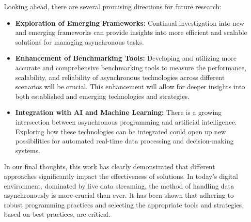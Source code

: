 Looking ahead, there are several promising directions for future research:

\begin{itemize}
    \item \textbf{Exploration of Emerging Frameworks:} Continual investigation into new and emerging frameworks can provide insights into more efficient and scalable solutions for managing asynchronous tasks.
    \item \textbf{Enhancement of Benchmarking Tools:} Developing and utilizing more accurate and comprehensive benchmarking tools to measure the performance, scalability, and reliability of asynchronous technologies across different scenarios will be crucial. This enhancement will allow for deeper insights into both established and emerging technologies and strategies.
    \item \textbf{Integration with AI and Machine Learning:} There is a growing intersection between asynchronous programming and artificial intelligence. Exploring how these technologies can be integrated could open up new possibilities for automated real-time data processing and decision-making systems.
\end{itemize}

In our final thoughts, this work has clearly demonstrated that different approaches significantly impact the effectiveness of solutions. In today's digital environment, dominated by live data streaming, the method of handling data asynchronously is more crucial than ever. It has been shown that adhering to robust programming practices and selecting the appropriate tools and strategies, based on best practices, are critical.


